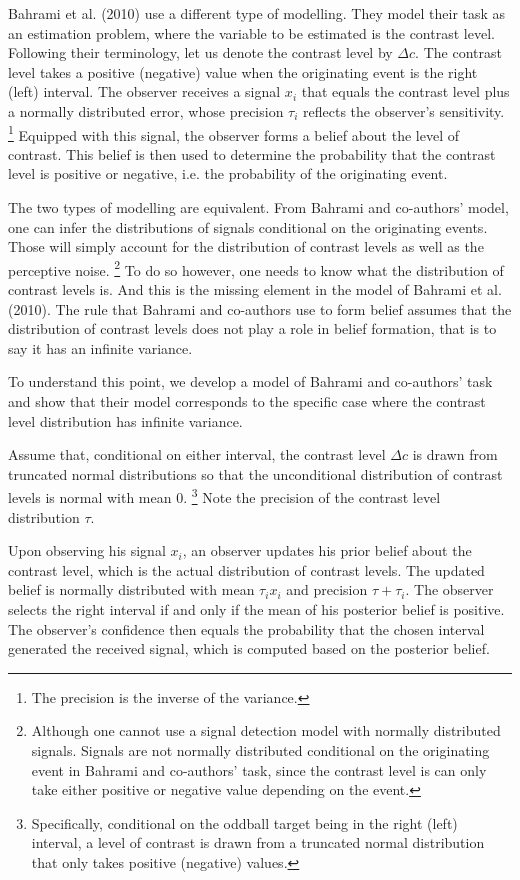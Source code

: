 \documentclass[12pt]{report}
\begin{document}
Bahrami et al. (2010) use a different type of modelling. They model their task as an estimation problem, where the variable to be estimated is the contrast level. Following their terminology, let us denote the contrast level by $\Delta c$. The contrast level takes a positive (negative) value when the originating event is the right (left) interval. The observer receives a signal $x_i$ that equals the contrast level plus a normally distributed error, whose precision $\tau_i$ reflects the observer's sensitivity. \footnote{The precision is the inverse of the variance.} Equipped with this signal, the observer forms a belief about the level of contrast. This belief is then used to determine the probability that the contrast level is positive or negative, i.e. the probability of the originating event. 

The two types of modelling are equivalent. From Bahrami and co-authors' model, one can infer the distributions of signals conditional on the originating events. Those will simply account for the distribution of contrast levels as well as the perceptive noise. \footnote{Although one cannot use a signal detection model with normally distributed signals. Signals are not normally distributed conditional on the originating event in Bahrami and co-authors' task, since the contrast level is can only take either positive or negative value depending on the event.} To do so however, one needs to know what the distribution of contrast levels is. And this is the missing element in the model of Bahrami et al. (2010). The rule that Bahrami and co-authors use to form belief assumes that the distribution of contrast levels does not play a role in belief formation, that is to say it has an infinite variance. 

To understand this point, we develop a model of Bahrami and co-authors' task and show that their model corresponds to the specific case where the contrast level distribution has infinite variance.

Assume that, conditional on either interval, the contrast level $\Delta c$ is drawn from truncated normal distributions so that the unconditional distribution of contrast levels is normal with mean 0. \footnote{Specifically, conditional on the oddball target being in the right (left) interval, a level of contrast is drawn from a truncated normal distribution that only takes positive (negative) values. } Note the precision of the contrast level distribution $\tau$. 

Upon observing his signal $x_i$, an observer updates his prior belief about the contrast level, which is the actual distribution of contrast levels. The updated belief is normally distributed with mean $\tau_i x_i$ and precision $\tau + \tau_i$. The observer selects the right interval if and only if the mean of his posterior belief is positive. The observer's confidence then equals the probability that the chosen interval generated the received signal, which is computed based on the posterior belief.
\end{document}

